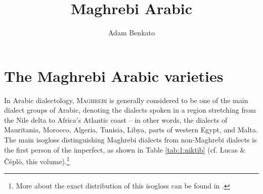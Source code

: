 \documentclass[output=paper]{langsci/langscibook}
\author{Adam Benkato\affiliation{University of California, Berkeley}}
\title{Maghrebi Arabic}
\begin{document}
  
\section{The Maghrebi Arabic varieties}

In Arabic dialectology, \textsc{Maghrebi} is generally considered to be one of the main dialect groups of Arabic, denoting the dialects spoken in a region stretching from the Nile delta to Africa’s Atlantic coast -- in other words, the dialects of Mauritania, Morocco, Algeria, Tunisia, Libya, parts of western Egypt, and Malta. The main isogloss distinguishing Maghrebi dialects from non-Maghrebi dialects is the first person of the imperfect, as shown in Table \ref{tab:1:niktib} (cf. Lucas \& Čéplö, this volume).\footnote{More about the exact distribution of this isogloss can be found in \citet{Behnstedt2016niktib}.}


\begin{table}
\caption{First-person imperfect `write' in Maghrebi and non-Maghrebi Arabic}
\label{tab:1:niktib}
\end{table}
\end{document}
